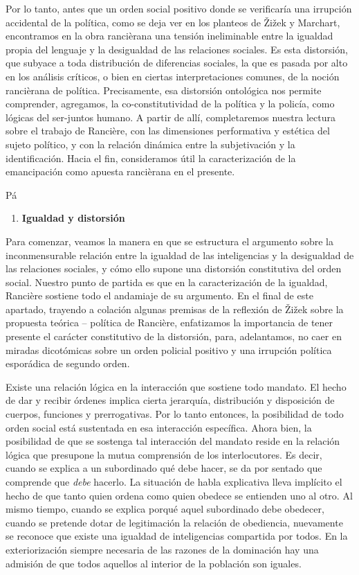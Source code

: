 Por lo tanto, antes que un orden social positivo donde se verificaría una irrupción accidental de la política, como se deja ver en los planteos de Žižek y Marchart, encontramos en la obra rancièrana una tensión ineliminable entre la igualdad propia del lenguaje y la desigualdad de las relaciones sociales. Es esta distorsión, que subyace a toda distribución de diferencias sociales, la que es pasada por alto en los análisis críticos, o bien en ciertas interpretaciones comunes, de la noción rancièrana de política. Precisamente, esa distorsión ontológica nos permite comprender, agregamos, la co-constitutividad de la política y la policía, como lógicas del ser-juntos humano. A partir de allí, completaremos nuestra lectura sobre el trabajo de Rancière, con las dimensiones performativa y estética del sujeto político, y con la relación dinámica entre la subjetivación y la identificación. Hacia el fin, consideramos útil la caracterización de la emancipación como apuesta rancièrana en el presente.

Pá

\begin{enumerate}
\def\labelenumi{\arabic{enumi}.}
\item
  \textbf{Igualdad y distorsión}
\end{enumerate}

Para comenzar, veamos la manera en que se estructura el argumento sobre la inconmensurable relación entre la igualdad de las inteligencias y la desigualdad de las relaciones sociales, y cómo ello supone una distorsión constitutiva del orden social. Nuestro punto de partida es que en la caracterización de la igualdad, Rancière sostiene todo el andamiaje de su argumento. En el final de este apartado, trayendo a colación algunas premisas de la reflexión de Žižek sobre la propuesta teórica -- política de Rancière, enfatizamos la importancia de tener presente el carácter constitutivo de la distorsión, para, adelantamos, no caer en miradas dicotómicas sobre un orden policial positivo y una irrupción política esporádica de segundo orden.

Existe una relación lógica en la interacción que sostiene todo mandato. El hecho de dar y recibir órdenes implica cierta jerarquía, distribución y disposición de cuerpos, funciones y prerrogativas. Por lo tanto entonces, la posibilidad de todo orden social está sustentada en esa interacción específica. Ahora bien, la posibilidad de que se sostenga tal interacción del mandato reside en la relación lógica que presupone la mutua comprensión de los interlocutores. Es decir, cuando se explica a un subordinado qué debe hacer, se da por sentado que comprende que \emph{debe} hacerlo. La situación de habla explicativa lleva implícito el hecho de que tanto quien ordena como quien obedece se entienden uno al otro. Al mismo tiempo, cuando se explica porqué aquel subordinado debe obedecer, cuando se pretende dotar de legitimación la relación de obediencia, nuevamente se reconoce que existe una igualdad de inteligencias compartida por todos. En la exteriorización siempre necesaria de las razones de la dominación hay una admisión de que todos aquellos al interior de la población son iguales.

